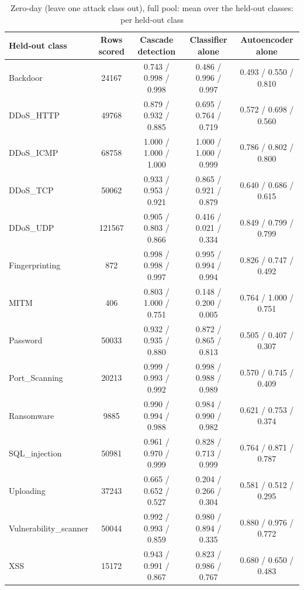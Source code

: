 \begin{table}[H]
\centering
\scriptsize
\setlength{\tabcolsep}{3pt}
\renewcommand{\arraystretch}{1.15}
\begin{tabular}{|l|c|c|c|c|}
\hline
\textbf{Held-out class} & \textbf{Rows scored} & \textbf{Cascade detection} & \textbf{Classifier alone} & \textbf{Autoencoder alone} \\ \hline
Backdoor & 24167 & 0.743 / 0.998 / 0.998 & 0.486 / 0.996 / 0.997 & 0.493 / 0.550 / 0.810 \\ \hline
DDoS\_HTTP & 49768 & 0.879 / 0.932 / 0.885 & 0.695 / 0.764 / 0.719 & 0.572 / 0.698 / 0.560 \\ \hline
DDoS\_ICMP & 68758 & 1.000 / 1.000 / 1.000 & 1.000 / 1.000 / 0.999 & 0.786 / 0.802 / 0.800 \\ \hline
DDoS\_TCP & 50062 & 0.933 / 0.953 / 0.921 & 0.865 / 0.921 / 0.879 & 0.640 / 0.686 / 0.615 \\ \hline
DDoS\_UDP & 121567 & 0.905 / 0.803 / 0.866 & 0.416 / 0.021 / 0.334 & 0.849 / 0.799 / 0.799 \\ \hline
Fingerprinting & 872 & 0.998 / 0.998 / 0.997 & 0.995 / 0.994 / 0.994 & 0.826 / 0.747 / 0.492 \\ \hline
MITM & 406 & 0.803 / 1.000 / 0.751 & 0.148 / 0.200 / 0.005 & 0.764 / 1.000 / 0.751 \\ \hline
Password & 50033 & 0.932 / 0.935 / 0.880 & 0.872 / 0.865 / 0.813 & 0.505 / 0.407 / 0.307 \\ \hline
Port\_Scanning & 20213 & 0.999 / 0.993 / 0.992 & 0.998 / 0.988 / 0.989 & 0.570 / 0.745 / 0.409 \\ \hline
Ransomware & 9885 & 0.990 / 0.994 / 0.988 & 0.984 / 0.990 / 0.982 & 0.621 / 0.753 / 0.374 \\ \hline
SQL\_injection & 50981 & 0.961 / 0.970 / 0.999 & 0.828 / 0.713 / 0.999 & 0.764 / 0.871 / 0.787 \\ \hline
Uploading & 37243 & 0.665 / 0.652 / 0.527 & 0.204 / 0.266 / 0.304 & 0.581 / 0.512 / 0.295 \\ \hline
Vulnerability\_scanner & 50044 & 0.992 / 0.993 / 0.859 & 0.980 / 0.894 / 0.335 & 0.880 / 0.976 / 0.772 \\ \hline
XSS & 15172 & 0.943 / 0.991 / 0.867 & 0.823 / 0.986 / 0.767 & 0.680 / 0.650 / 0.483 \\ \hline
\end{tabular}
\caption{Zero-day (leave one attack class out), full pool: mean over the held-out classes: per held-out class}
\label{tab:full_zeroday_class}
\end{table}

